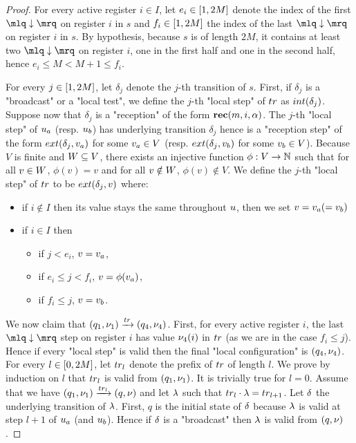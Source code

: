 \begin{proof}
	For every active register $i \in I$, let $e_i \in [1,2M]$ denote the index of the first $\quotemarks{\enregact}$ on register $i$ in $s$ and $f_i \in [1,2M]$ the index of the last $\quotemarks{\enregact}$ on register $i$ in $s$. By hypothesis, because $s$ is of length $2M$, it contains at least two $\quotemarks{\enregact}$ on register $i$, one in the first half and one in the second half, hence $e_i \leq M < M +1 \leq f_i$. 
	
	For every $j \in [1,2M]$, let $\delta_j$ denote the $j$-th transition of $s$. First, if  $\delta_j$ is a "broadcast" or a "local test", we define the $j$-th "local step" of $\atrace$ as $\intlabel{\delta_j}$. 
	Suppose now that $\delta_j$ is a "reception" of the form $\textbf{rec}(m, i, \alpha)$. The $j$-th "local step" of $u_a$ (resp. $u_b$) has underlying transition $\delta_j$ hence is a "reception step" of the form $\extlabel{\delta_j}{\aval_a}$ for some $v_a \in V$ (resp. $\extlabel{\delta_j}{\aval_b}$ for some $v_b \in V$).
	Because $V$ is finite and $W \subseteq V$, there exists an injective function $\phi: V \rightarrow \mathbb{N}$ such that for all $v \in W$, $\phi(v) = v$ and for all $v \notin W$, $\phi(v) \notin V$.
	We define the $j$-th "local step" of $\atrace$ to be $\extlabel{\delta_j}{\aval}$ where:
	\begin{itemize}
		\item if $i \notin I$ then its value stays the same throughout $u$, then we set $v = v_a (= v_b)$ 
		\item if $i \in I$ then  
		\begin{itemize}
			\item if $j < e_i$, $v = v_a$,
			\item if $e_i \leq j < f_i$, $v = \phi(v_a)$,
			\item if $f_i \leq j$, $v = v_b$.
		\end{itemize}
	\end{itemize}
	We now claim that $(q_1,\localdata_1) \step{\atrace} (q_4,\localdata_4)$. 
	First, for every active register $i$, the last $\quotemarks{\enregact}$ step on register $i$ has value $\nu_4(i)$ in $\atrace$ (as we are in the case $f_i \leq j$). Hence if every "local step" is valid then the final "local configuration" is $(q_4, \nu_4)$.
	For every $l \in [0,2M]$, let $\atrace_l$ denote the prefix of $\atrace$ of length $l$.
	We prove by induction on $l$ that $\atrace_l$ is valid from $(q_1, \nu_1)$. It is trivially true for $l =0$. Assume that we have $(q_1, \localdata_1) \step{\atrace_l} (q, \localdata)$ and let $\lambda$ such that $\atrace_l \cdot \locallabel = \atrace_{l+1}$. Let $\delta$ the underlying transition of $\lambda$.
	First, $q$ is the initial state of $\delta$ because $\lambda$ is valid at step $l+1$ of $u_a$ (and $u_b$). Hence if $\delta$ is a "broadcast" then $\lambda$ is valid from $(q,\nu)$.
	

\end{proof}

